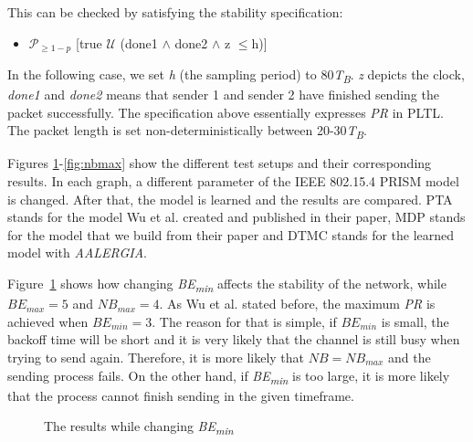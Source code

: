 \documentclass[
a4paper,
12pt
]{scrartcl}
\begin{document}
This can be checked by satisfying the stability specification:

\begin{itemize}
  \item $\mathcal{P}_{\geq1-p}$ [true $\mathcal{U}$ (done1 $\land$ done2 $\land$ z $\leq$h)]
\end{itemize}

In the following case, we set \textit{h} (the sampling period) to 80\textit{T\textsubscript{B}}. \textit{z} depicts the clock, \textit{done1} and \textit{done2} means that sender 1 and sender 2 have finished sending the packet successfully. The specification above essentially expresses \textit{PR} in PLTL. The packet length is set non-deterministically between 20-30\textit{T\textsubscript{B}}.

Figures \ref{fig:bemin}-\ref{fig:nbmax} show the different test setups and their corresponding results. In each graph, a different parameter of the IEEE 802.15.4 PRISM model is changed. After that, the model is learned and the results are compared. PTA stands for the model Wu et al. created and published in their paper, MDP stands for the model that we build from their paper and DTMC stands for the learned model with \emph{AALERGIA}.

Figure~\ref{fig:bemin} shows how changing \textit{BE\textsubscript{min}} affects the stability of the network, while $BE_{max}=5$ and $NB_{max}=4$. As Wu et al. stated before, the maximum \textit{PR} is achieved when $BE_{min}=3$. The reason for that is simple, if $BE_{min}$ is small, the backoff time will be short and it is very likely that the channel is still busy when trying to send again. Therefore, it is more likely that $NB=NB_{max}$ and the sending process fails. On the other hand, if \textit{BE\textsubscript{min}} is too large, it is more likely that the process cannot finish sending in the given timeframe.

\begin{figure}[H]
\centering
 \caption{The results while changing \textit{BE\textsubscript{min}}}
  \label{fig:bemin}
\end{figure}
\end{document}

